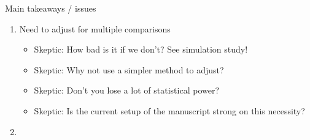 \documentclass[11pt,a4paper]{article}
\theoremstyle{definition} %
\theoremstyle{case}
\begin{document}
Main takeaways / issues
\begin{enumerate}
    \item Need to adjust for multiple comparisons
    \begin{itemize}
        \item Skeptic: How bad is it if we don't? See simulation study!
        \item Skeptic: Why not use a simpler method to adjust?
        \item Skeptic: Don't you lose a lot of statistical power?
        \item Skeptic: Is the current setup of the manuscript strong on this necessity?
    \end{itemize}
    \item
\end{enumerate}
\fi



\iffalse
\end{document}
